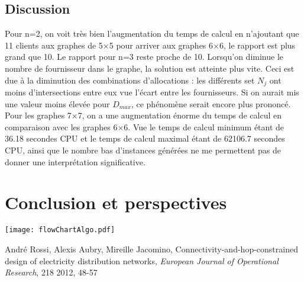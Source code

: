 \documentclass[12pt,a4paper]{article}
\begin{document}
\begin{multicols}{2}
\subsection{Discussion}
Pour n=2, on voit très bien l'augmentation du temps de calcul en n'ajoutant que 11 clients aux graphes de 5$\times$5 pour arriver aux graphes 6$\times$6, le rapport est plus grand que 10. Le rapport pour n=3 reste proche de 10. Lorsqu'on diminue le nombre de fournisseur dans le graphe, la solution est atteinte plus vite. Ceci est due à la diminution des combinations d'allocations : les différents set $N_{j}$ ont moins d'intersections entre eux vue l'écart entre les fournisseurs. Si on aurait mis une valeur moins élevée pour $D_{max}$, ce phénomène serait encore plus prononcé.\newline \indent
Pour les graphes 7$\times$7, on a une augmentation énorme du temps de calcul en comparaison avec les graphes 6$\times$6. Vue le temps de calcul minimum étant de 36.18 secondes CPU et le temps de calcul maximal étant de 62106.7 secondes CPU, ainsi que le nombre bas d'instances générées ne me permettent pas de donner une interprétation significative.
\section{Conclusion et perspectives}


\end{multicols}
\begingroup
    \centering
    \texttt{[image: flowChartAlgo.pdf]}
    \label{fig:algo}
\endgroup
\begin{multicols}{2}


\begin{thebibliography}{20}
André Rossi, Alexis Aubry, Mireille Jacomino, Connectivity-and-hop-constrained design of electricity distribution networks,  \textit{European Journal of Operational Research}, 218 2012, 48-57
\end{thebibliography}
\end{multicols}
\end{document}
